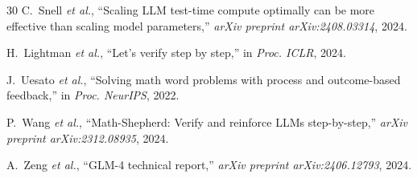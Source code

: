\documentclass[10pt,twocolumn]{article}
\begin{document}
\begin{thebibliography}{30}
C.~Snell \textit{et al.}, ``Scaling LLM test-time compute optimally can be more effective than scaling model parameters,'' \textit{arXiv preprint arXiv:2408.03314}, 2024.

H.~Lightman \textit{et al.}, ``Let's verify step by step,'' in \textit{Proc. ICLR}, 2024.

J.~Uesato \textit{et al.}, ``Solving math word problems with process and outcome-based feedback,'' in \textit{Proc. NeurIPS}, 2022.

P.~Wang \textit{et al.}, ``Math-Shepherd: Verify and reinforce LLMs step-by-step,'' \textit{arXiv preprint arXiv:2312.08935}, 2024.

A.~Zeng \textit{et al.}, ``GLM-4 technical report,'' \textit{arXiv preprint arXiv:2406.12793}, 2024.

\end{thebibliography}
\end{document}
